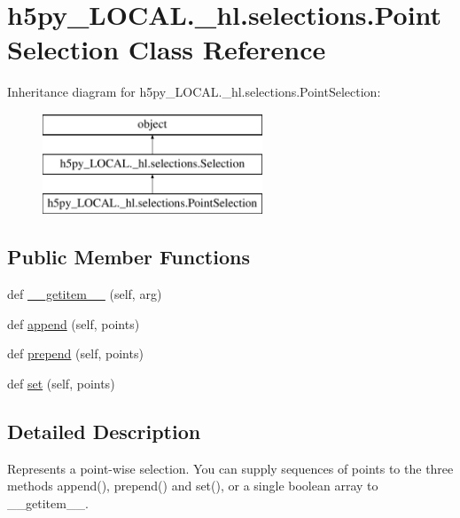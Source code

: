 \hypertarget{classh5py__LOCAL_1_1__hl_1_1selections_1_1PointSelection}{}\section{h5py\+\_\+\+L\+O\+C\+A\+L.\+\_\+hl.\+selections.\+Point\+Selection Class Reference}
\label{classh5py__LOCAL_1_1__hl_1_1selections_1_1PointSelection}
Inheritance diagram for h5py\+\_\+\+L\+O\+C\+A\+L.\+\_\+hl.\+selections.\+Point\+Selection\+:\begin{figure}[H]
\begin{center}
\leavevmode
\includegraphics[height=3.000000cm]{classh5py__LOCAL_1_1__hl_1_1selections_1_1PointSelection}
\end{center}
\end{figure}
\subsection*{Public Member Functions}
\begin{DoxyCompactItemize}
\item 
def \hyperlink{classh5py__LOCAL_1_1__hl_1_1selections_1_1PointSelection_ab62dc7614e7aa483329bf3394239deb1}{\+\_\+\+\_\+getitem\+\_\+\+\_\+} (self, arg)
\item 
def \hyperlink{classh5py__LOCAL_1_1__hl_1_1selections_1_1PointSelection_a5205c94ad6e456fe66dc8200e1e36ccf}{append} (self, points)
\item 
def \hyperlink{classh5py__LOCAL_1_1__hl_1_1selections_1_1PointSelection_a0c206ef785950061e213bf8c51bb8be4}{prepend} (self, points)
\item 
def \hyperlink{classh5py__LOCAL_1_1__hl_1_1selections_1_1PointSelection_ab13263364c3ace60d2eb6a6262dfc026}{set} (self, points)
\end{DoxyCompactItemize}


\subsection{Detailed Description}
\begin{DoxyVerb}    Represents a point-wise selection.  You can supply sequences of
    points to the three methods append(), prepend() and set(), or a
    single boolean array to __getitem__.
\end{DoxyVerb}
 

